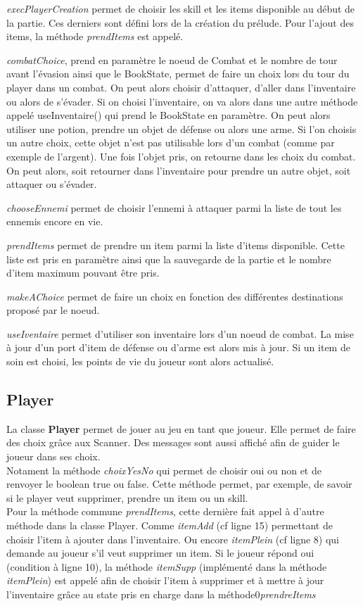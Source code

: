 		\textit{execPlayerCreation} permet de choisir les skill et les items disponible au début de la partie. Ces derniers sont défini lors de la création du prélude. Pour l'ajout des items, la méthode \textit{prendItems} est appelé.

		\textit{combatChoice}, prend en paramètre le noeud de Combat et le nombre de tour avant l'évasion ainsi que le BookState, permet de faire un choix lors du tour du player dans un combat. On peut alors choisir d'attaquer, d'aller dans l'inventaire ou alors de s'évader. Si on choisi l'inventaire, on va alors dans une autre méthode appelé useInventaire() qui prend le BookState en paramètre. On peut alors utiliser une potion, prendre un objet de défense ou alors une arme. Si l'on choisis un autre choix, cette objet n'est pas utilisable lors d'un combat (comme par exemple de l'argent). Une fois l'objet pris, on retourne dans les choix du combat. On peut alors, soit retourner dans l'inventaire pour prendre un autre objet, soit attaquer ou s'évader.

		\textit{chooseEnnemi} permet de choisir l'ennemi à attaquer parmi la liste de tout les ennemis encore en vie.

		\textit{prendItems} permet de prendre un item parmi la liste d'items disponible. Cette liste est pris en paramètre ainsi que la sauvegarde de la partie et le nombre d'item maximum pouvant être pris.

		\textit{makeAChoice} permet de faire un choix en fonction des différentes destinations proposé par le noeud.

		\textit{useIventaire} permet d'utiliser son inventaire lors d'un noeud de combat. La mise à jour d'un port d'item de défense ou d'arme est alors mis à jour. Si un item de soin est choisi, les points de vie du joueur sont alors actualisé.

	\subsection{Player}
		La classe \textbf{Player} permet de jouer au jeu en tant que joueur. Elle permet de faire des choix grâce aux Scanner. Des messages sont aussi affiché afin de guider le joueur dans ses choix.\\
		Notament la méthode \textit{choixYesNo} qui permet de choisir oui ou non et de renvoyer le boolean true ou false. Cette méthode permet, par exemple, de savoir si le player veut supprimer, prendre un item ou un skill.\\
		Pour la méthode commune \textit{prendItems}, cette dernière fait appel à d'autre méthode dans la classe Player. Comme \textit{itemAdd} (cf ligne 15) permettant de choisir l'item à ajouter dans l'inventaire. Ou encore \textit{itemPlein} (cf ligne 8) qui demande au joueur s'il veut supprimer un item. Si le joueur répond oui (condition à ligne 10), la méthode \textit{itemSupp} (implémenté dans la méthode \textit{itemPlein}) est appelé afin de choisir l'item à supprimer et à mettre à jour l'inventaire grâce au state pris en charge dans la méthode0\textit{prendreItems}

